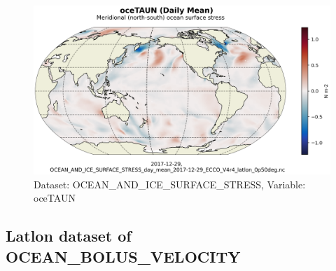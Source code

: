 \begin{figure}[H]
\centering
\includegraphics[scale=0.55]{../images/plots/latlon_plots/Ocean_and_Sea-Ice_Surface_Stress/oceTAUN.png}
\caption{Dataset: OCEAN\_AND\_ICE\_SURFACE\_STRESS, Variable: oceTAUN}
\label{tab:table-OCEAN_AND_ICE_SURFACE_STRESS_oceTAUN-Plot}
\end{figure}
\subsection{Latlon dataset of OCEAN\_BOLUS\_VELOCITY}
\newp
